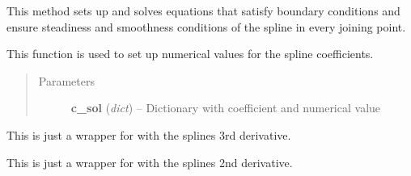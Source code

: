 \documentclass[letterpaper,10pt,english]{sphinxmanual}
\begin{document}
\begin{fulllineitems}
\begin{fulllineitems}
\end{fulllineitems}


\begin{fulllineitems}
\label{pytrajectory:pytrajectory.spline.CubicSpline.makesteady}
This method sets up and solves equations that satisfy boundary conditions and
ensure steadiness and smoothness conditions of the spline in every joining point.

\end{fulllineitems}


\begin{fulllineitems}
\label{pytrajectory:pytrajectory.spline.CubicSpline.set_coeffs}
This function is used to set up numerical values for the spline coefficients.
\begin{quote}\begin{description}
\item[{Parameters}] \leavevmode
\textbf{c\_sol} (\emph{dict}) -- Dictionary with coefficient and numerical value

\end{description}\end{quote}

\end{fulllineitems}


\begin{fulllineitems}
\label{pytrajectory:pytrajectory.spline.CubicSpline.tmp_dddf}
This is just a wrapper for {\hyperref[pytrajectory:pytrajectory.spline.CubicSpline.tmp_evalf]{}} with the splines 3rd derivative.

\end{fulllineitems}


\begin{fulllineitems}
\label{pytrajectory:pytrajectory.spline.CubicSpline.tmp_ddf}
This is just a wrapper for {\hyperref[pytrajectory:pytrajectory.spline.CubicSpline.tmp_evalf]{}} with the splines 2nd derivative.


\end{fulllineitems}
\end{fulllineitems}
\end{document}
